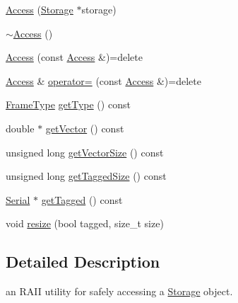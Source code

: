 \begin{DoxyCompactItemize}
\item 
\hyperlink{class_frame_lib___local_allocator_1_1_storage_1_1_access_a02ea2f7c9943eb1fcd0963a685e0d7fd}{Access} (\hyperlink{class_frame_lib___local_allocator_1_1_storage}{Storage} $\ast$storage)
\item 
\hyperlink{class_frame_lib___local_allocator_1_1_storage_1_1_access_a15a62c966e41b3a5ea69f7dd56b2d9a2}{$\sim$\+Access} ()
\item 
\hyperlink{class_frame_lib___local_allocator_1_1_storage_1_1_access_a19c0194ff9a802ae0978a29bc217b237}{Access} (const \hyperlink{class_frame_lib___local_allocator_1_1_storage_1_1_access}{Access} \&)=delete
\item 
\hyperlink{class_frame_lib___local_allocator_1_1_storage_1_1_access}{Access} \& \hyperlink{class_frame_lib___local_allocator_1_1_storage_1_1_access_a9b8e0d8f30fd3b6c58c1d8290968086b}{operator=} (const \hyperlink{class_frame_lib___local_allocator_1_1_storage_1_1_access}{Access} \&)=delete
\item 
\hyperlink{_frame_lib___types_8h_ad495a9f61af7fff07d7e97979d1ab854}{Frame\+Type} \hyperlink{class_frame_lib___local_allocator_1_1_storage_1_1_access_aed5345a46f87f7ef3beb05b68f31fd31}{get\+Type} () const
\item 
double $\ast$ \hyperlink{class_frame_lib___local_allocator_1_1_storage_1_1_access_a8ab7864388a3b8ef384e796b0609b808}{get\+Vector} () const
\item 
unsigned long \hyperlink{class_frame_lib___local_allocator_1_1_storage_1_1_access_a321a445a9999cbdfdfbf51bf20924ccc}{get\+Vector\+Size} () const
\item 
unsigned long \hyperlink{class_frame_lib___local_allocator_1_1_storage_1_1_access_a9538ca22ad01d88328ef3a0230231ff1}{get\+Tagged\+Size} () const
\item 
\hyperlink{class_frame_lib___parameters_1_1_serial}{Serial} $\ast$ \hyperlink{class_frame_lib___local_allocator_1_1_storage_1_1_access_af010002f0baeb791cd6a4b19f7879f13}{get\+Tagged} () const
\item 
void \hyperlink{class_frame_lib___local_allocator_1_1_storage_1_1_access_a7b730ca5d82115b00d018114c21604d3}{resize} (bool tagged, size\+\_\+t size)
\end{DoxyCompactItemize}


\subsection{Detailed Description}
an R\+A\+II utility for safely accessing a \hyperlink{class_frame_lib___local_allocator_1_1_storage}{Storage} object. 

